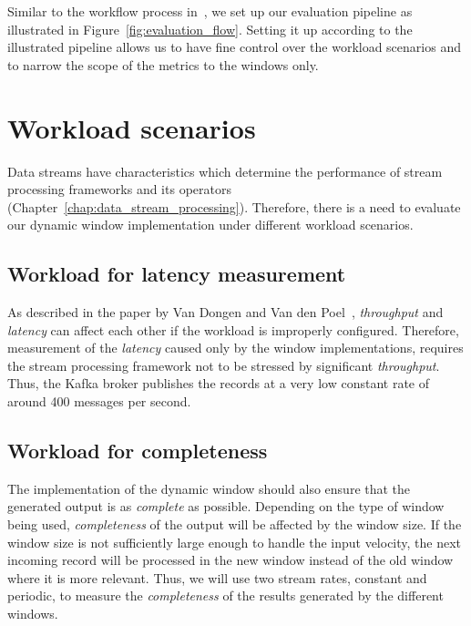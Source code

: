 Similar to the workflow process in~\cite{evalution_of_spe, benchmark_sce}, we set up
our evaluation pipeline as illustrated in Figure~\ref{fig:evaluation_flow}. Setting it 
up according to the illustrated pipeline allows us to have fine control over the 
workload scenarios and to narrow the scope of the metrics to the windows only. 




\section{Workload scenarios}
\label{sec:workload}
Data streams have characteristics 
which determine the performance of stream processing frameworks and its 
operators (Chapter~\ref{chap:data_stream_processing}). Therefore, 
there is a need to evaluate our dynamic window implementation under different workload scenarios. 

\subsection{Workload for latency measurement}
As described in the paper by Van Dongen and Van den Poel~\cite{evalution_of_spe}, 
\emph{throughput} and \emph{latency} can affect each other if the workload is 
improperly configured. Therefore, measurement of the \emph{latency} caused only 
by the window implementations, requires the stream processing framework not to be 
stressed by significant \emph{throughput}. Thus, the Kafka broker 
publishes the records at a very low constant rate of around 400 messages per second. 


\subsection{Workload for completeness}
The implementation of the dynamic window should also ensure that the generated 
output is as \emph{complete} as possible. 
Depending on the type of window being used, \emph{completeness} of the output will be
affected by the window size. If the window size is not sufficiently large enough to handle 
the input velocity, the next incoming record will be processed in the new window instead of 
the old window where it is more relevant. Thus, 
we will use two stream rates, constant and periodic, to measure the \emph{completeness} of the results generated 
by the different windows. 

